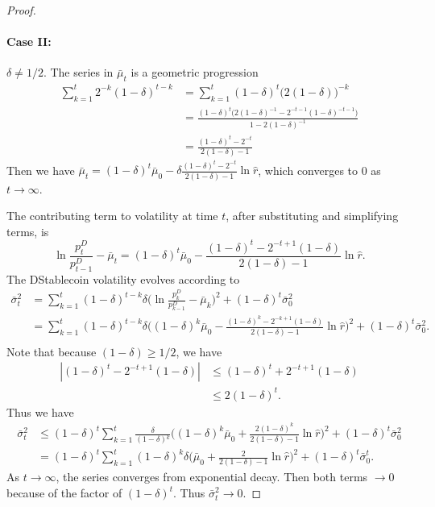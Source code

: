 \begin{proof}
	
	\paragraph{Case II:} $\delta \neq 1/2$. The series in $\bar\mu_t$ is a geometric progression
	$$\begin{aligned}
	\sum_{k=1}^t 2^{-k}(1-\delta)^{t-k} &= \sum_{k=1}^t (1-\delta)^t \Big(2(1-\delta)\Big)^{-k} \\
	&= \frac{(1-\delta)^t\Big( 2(1-\delta)^{-1} - 2^{-t-1}(1-\delta)^{-t-1}\Big)}{1- 2(1-\delta)^{-1}} \\
	&= \frac{(1-\delta)^t - 2^{-t}}{2(1-\delta)-1}
	\end{aligned}$$
	Then we have
	$\bar\mu_t = (1-\delta)^t \bar\mu_0 - \delta \frac{(1-\delta)^t-2^{-t}}{2(1-\delta)-1} \ln \hat r$, which converges to 0 as $t\rightarrow\infty$.
	
	The contributing term to volatility at time $t$, after substituting and simplifying terms, is
	$$\ln \frac{p_t^D}{p_{t-1}^D} - \bar\mu_t
	= (1-\delta)^t \bar\mu_0 - \frac{(1-\delta)^t -2^{-t+1}(1-\delta)}{2(1-\delta)-1}\ln \hat r.$$
	The DStablecoin volatility evolves according to
	$$\begin{aligned}
	\bar\sigma_t^2 &= \sum_{k=1}^t (1-\delta)^{t-k} \delta \Big(\ln \frac{p_k^D}{p_{k-1}^D} -\bar\mu_k\Big)^2 + (1-\delta)^t \bar\sigma_0^2 \\
	&= \sum_{k=1}^t (1-\delta)^{t-k}\delta \Big( (1-\delta)^k \bar\mu_0 - \frac{(1-\delta)^k -2^{-k+1}(1-\delta)}{2(1-\delta)-1}\ln \hat r \Big)^2 + (1-\delta)^t \bar\sigma_0^2. \\
	\end{aligned}$$
	Note that because $(1-\delta) \geq 1/2$, we have
	$$\begin{aligned}
	|(1-\delta)^t - 2^{-t+1}(1-\delta)| &\leq (1-\delta)^t + 2^{-t+1}(1-\delta) \\
	&\leq 2(1-\delta)^t.
	\end{aligned}$$
	Thus we have
	$$\begin{aligned}
	\bar\sigma_t^2 &\leq (1-\delta)^t \sum_{k=1}^t \frac{\delta}{(1-\delta){^k}} \Big( (1-\delta)^k \bar\mu_0 + \frac{2(1-\delta)^k}{2(1-\delta)-1}\ln \hat r \Big)^2 + (1-\delta)^t \bar\sigma_0^2 \\
	&= (1-\delta)^t \sum_{k=1}^t (1-\delta)^{k}\delta \Big( \bar\mu_0 + \frac{2}{2(1-\delta)-1}\ln \hat r \Big)^2 + (1-\delta)^t \bar\sigma_0^t.
	\end{aligned}$$
	As $t\rightarrow\infty$, the series converges from exponential decay. Then both terms $\rightarrow 0$ because of the factor of $(1-\delta)^t$. Thus $\bar\sigma_t^2 \rightarrow 0$.
\end{proof}







